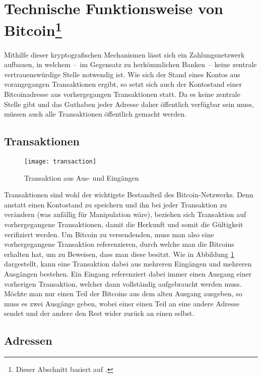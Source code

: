 \section[Technische Funktionsweise von Bitcoin]{Technische Funktionsweise von Bitcoin\footnote{Dieser Abschnitt basiert auf \cite{nielsen}.}}
\label{sec:mechanics}

Mithilfe dieser kryptografischen Mechanismen lässt sich ein Zahlungsnetzwerk aufbauen, in welchem --~im Gegensatz zu herkömmlichen Banken~-- keine zentrale vertrauenswürdige Stelle notwendig ist.
Wie sich der Stand eines Kontos aus vorangegangen Transaktionen ergibt, so setzt sich auch der Kontostand einer Bitcoinadresse aus vorhergegangen Transaktionen statt.
Da es keine zentrale Stelle gibt und das Guthaben jeder Adresse daher öffentlich verfügbar sein muss, müssen auch alle Transaktionen öffentlich gemacht werden.

\subsection{Transaktionen}

\begin{figure}
    \begin{center}
		\texttt{[image: transaction]}
    	\caption{Transaktion aus Aus- und Eingängen \parencite[5]{nakamoto}}
    	\label{fig:transaction}
    \end{center}
\end{figure}

Transaktionen sind wohl der wichtigste Bestandteil des Bitcoin-Netzwerks.
Denn anstatt einen Kontostand zu speichern und ihn bei jeder Transaktion zu verändern (was anfällig für Manipulation wäre), beziehen sich Transaktion auf vorhergegangene Transaktionen, damit die Herkunft und somit die Gültigkeit verifiziert werden.
Um Bitcoin zu versendenden, muss man also eine vorhergegangene Transaktion referenzieren, durch welche man die Bitcoins erhalten hat, um zu Beweisen, dass man diese besitzt.
Wie in Abbildung \ref{fig:transaction} dargestellt, kann eine Transaktion dabei aus mehreren Eingängen und mehreren Ausgängen bestehen.
Ein Eingang referenziert dabei immer einen Ausgang einer vorherigen Transaktion, welcher dann vollständig aufgebraucht werden muss.
Möchte man nur einen Teil der Bitcoins aus dem alten Ausgang ausgeben, so muss es zwei Ausgänge geben, wobei einer einen Teil an eine andere Adresse sendet und der andere den Rest wider zurück an einen selbst.

\subsection{Adressen}

